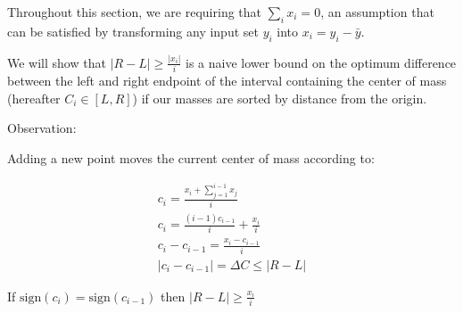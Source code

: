 \documentclass[11pt,twocolumn]{article}
\begin{document}
Throughout this section, we are requiring that $ \sum_i x_i = 0 $, an assumption that can be satisfied by transforming any input set $ y_i $ into $ x_i = y_i - \bar{y}$. 

We will show that $|R-L| \geq \frac{|x_i|}{i} $ is a naive lower bound on the optimum difference between the left and right endpoint of the interval containing the center of mass (hereafter $ C_i \in [ L, R ] $) if our masses are sorted by distance from the origin. 

Observation:

Adding a new point moves the current center of mass according to:

\begin{eqnarray*}
c_i = \frac{ x_i + \sum_{j=1}^{i-1} x_j }{ i } \\ 
c_i = \frac{ (i-1) c_{i-1}}{i} + \frac{x_i }{ i }  \\
c_i - c_{i-1} = \frac{x_i - c_{i - 1} }{ i } \\
|c_i - c_{i-1}| = \Delta C \leq |R - L|
\end{eqnarray*}

\begin{lem} \label{lem:matchSignNaive}
If $\textrm{sign}(c_i) = \textrm{sign}(c_{i-1})$ then $|R - L| \geq \frac{x_i}{i}$
\end{lem}
\end{document}
